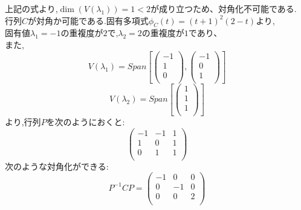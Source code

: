 \documentclass{jreport}
\begin{document}
上記の式より,$\dim(V(\lambda_1)) =1 <2$が成り立つため、対角化不可能である.\\
行列$C$が対角か可能である.固有多項式$\phi_C(t) =(t+1)^2(2-t)$より,\\
固有値$\lambda_1 =-1$の重複度が$2$で,$\lambda_2 =2$の重複度が$1$であり、\\
また,
$$
V(\lambda_1) =Span[\left(
                        \begin{array}{c}
                                -1\\
                                1\\
                                0\\
                        \end{array}
                        \right)
			,
			\left(
			\begin{array}{c}
				-1\\
				0\\
				1\\
			\end{array}
			\right)
                        ]
$$
$$
V(\lambda_2) = Span[\left(
			\begin{array}{c}
				1\\
				1\\
				1\\
			\end{array}
			\right)
			]
$$
より,行列$P$を次のようにおくと:
$$
\left(
\begin{array}{ccc}
	-1 & -1 &  1\\
	 1 &  0 &  1\\
	 0 &  1 &  1\\
\end{array}
\right)
$$
次のような対角化ができる:\\
$$
P^{-1}CP=
\left(
\begin{array}{ccc}
	-1 & 0 & 0\\
	0  & -1 & 0\\
	0  &  0 & 2\\
\end{array}
\right)
$$
\end{document}
